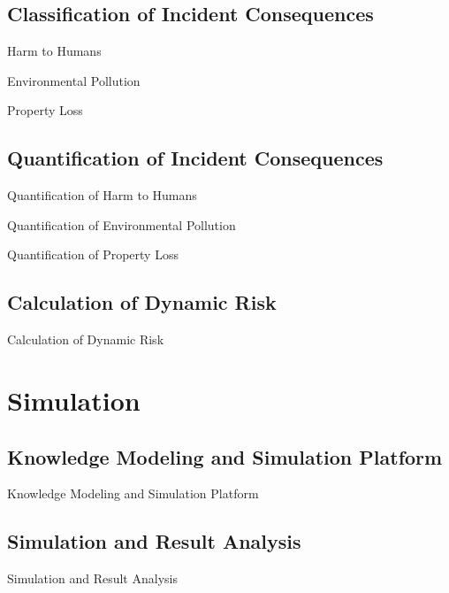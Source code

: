 \documentclass[10pt, compress]{beamer}
\begin{document}
\subsection{Classification of Incident Consequences}
\begin{frame}{Harm to Humans}
\end{frame}

\begin{frame}{Environmental Pollution}
\end{frame}

\begin{frame}{Property Loss}
\end{frame}

\subsection{Quantification of Incident Consequences}
\begin{frame}{Quantification of Harm to Humans}
\end{frame}

\begin{frame}{Quantification of Environmental Pollution}
\end{frame}

\begin{frame}{Quantification of Property Loss}
\end{frame}

\subsection{Calculation of Dynamic Risk}
\begin{frame}{Calculation of Dynamic Risk}
\end{frame}

\section{Simulation}
\subsection{Knowledge Modeling and Simulation Platform}
\begin{frame}{Knowledge Modeling and Simulation Platform}
\end{frame}

\subsection{Simulation and Result Analysis}
\begin{frame}{Simulation and Result Analysis}
\end{frame}
\end{document}
